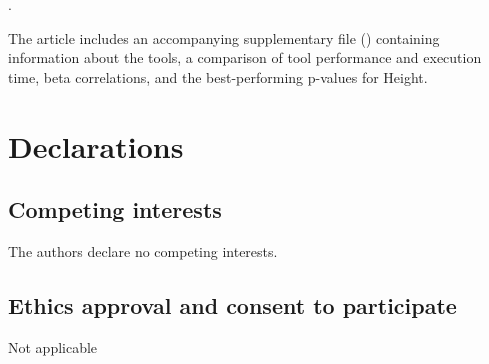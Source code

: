 \documentclass[pdflatex,sn-nature]{sn-jnl}%
\begin{document}




 

 . 

\backmatter


The article includes an accompanying supplementary file () containing information about the tools, a comparison of tool performance and execution time, beta correlations, and the best-performing p-values for Height.
 

\section*{Declarations}
 

\subsection*{Competing interests}
The authors declare no competing interests.

\subsection*{Ethics approval and consent to participate}
Not applicable
\end{document}
